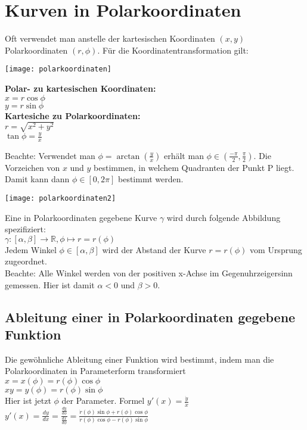 \documentclass[../main.tex]{subfiles}
\begin{document}
\section{Kurven in Polarkoordinaten}

Oft verwendet man anstelle der kartesischen Koordinaten $(x,y)$ Polarkoordinaten $(r, \phi)$.
Für die Koordinatentransformation gilt: \\ [7pt]
\begin{minipage}{0.5\textwidth}
    \texttt{[image: polarkoordinaten]}
\end{minipage} \hfill
\begin{minipage}{0.45\textwidth}
    \textbf{Polar- zu kartesischen Koordinaten:} \\ [7pt]
    $x = r \cos \phi$ \\ [7pt]
    $y = r \sin \phi$ \\ [7pt]
    \textbf{Kartesiche zu Polarkoordinaten:} \\ [7pt]
    $r=\sqrt{x^2 + y^2}$ \\ [7pt]
    $\tan \phi = \frac{y}{x}$
\end{minipage}
Beachte: Verwendet man $\phi = \arctan(\frac{y}{x})$ erhält man $\phi \in (\frac{-\pi}{2},\frac{\pi}{2})$.
Die Vorzeichen von $x$ und $y$ bestimmen, in welchem Quadranten der Punkt P liegt. 
Damit kann dann $\phi \in [0,2\pi]$ bestimmt werden. \\

\begin{minipage}{0.5\textwidth}
    \texttt{[image: polarkoordinaten2]}
\end{minipage} \hfill
\begin{minipage}{0.45\textwidth}
    Eine in Polarkoordinaten gegebene Kurve $\gamma$ wird durch folgende Abbildung spezifiziert: \\
    $\gamma : [\alpha, \beta] \to \mathbb{R}, \phi \mapsto r = r(\phi)$ \\ [7pt]
    Jedem Winkel $\phi \in [\alpha, \beta]$ wird der Abstand der Kurve $r=r(\phi)$ vom Ursprung zugeordnet. \\ [7pt]
    Beachte: Alle Winkel werden von der positiven x-Achse im Gegenuhrzeigersinn gemessen. Hier ist damit $\alpha < 0$ und $\beta > 0$.
\end{minipage}

\subsection{Ableitung einer in Polarkoordinaten gegebene Funktion}
Die gewöhnliche Ableitung einer Funktion wird bestimmt, indem man die Polarkoordinaten in Parameterform transformiert \\ [7pt]
$x = x(\phi) = r(\phi)\cos \phi$ \\
$xy = y(\phi) = r(\phi)\sin \phi$ \\ [7pt]
Hier ist jetzt $\phi$ der Parameter. Formel $y'(x)=\frac{\dot{y}}{\dot{x}}$ \\ [7pt]
$y'(x)=\frac{dy}{dx}=\frac{\frac{dy}{d\phi}}{\frac{dx}{d\phi}}=\frac{\dot{r}(\phi)\sin \phi + r(\phi)\cos \phi}{\dot{r}(\phi)\cos \phi - r(\phi)\sin \phi}$
\end{document}
